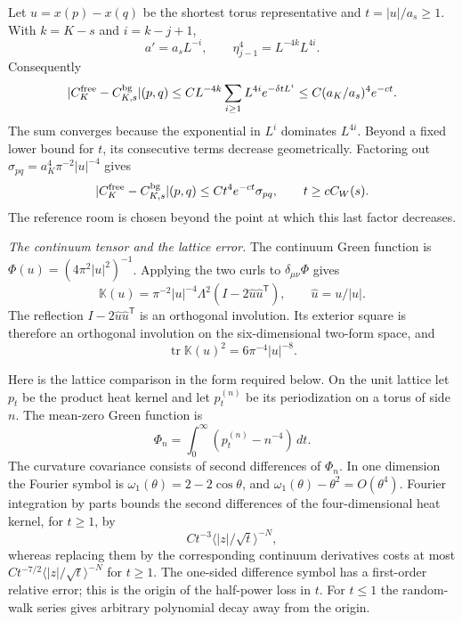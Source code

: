 \documentclass[11pt,letterpaper,reqno]{amsart}
\theoremstyle{definition}
\theoremstyle{remark}
\newcommand{\tr}{\operatorname{tr}}
\begin{document}
Let $u=x(p)-x(q)$ be the shortest torus representative and
$t=|u|/a_s\ge1$. With $k=K-s$ and $i=k-j+1$,
\[
 a'=a_sL^{-i},\qquad
 \eta_{j-1}^4=L^{-4k}L^{4i}.
\]
Consequently
\[
 |C_K^{\rm free}-C_{K,s}^{\rm bg}|(p,q)
 \le CL^{-4k}\sum_{i\ge1}L^{4i}e^{-\delta tL^i}
 \le C(a_K/a_s)^4e^{-ct}.
\]
The sum converges because the exponential in $L^i$ dominates
$L^{4i}$. Beyond a fixed lower bound for $t$, its consecutive
terms decrease geometrically. Factoring out
$\sigma_{pq}=a_K^4\pi^{-2}|u|^{-4}$ gives
\[
 |C_K^{\rm free}-C_{K,s}^{\rm bg}|(p,q)
       \le Ct^4e^{-ct}\sigma_{pq},
       \qquad t\ge cC_W(s).
\]
The reference room is chosen beyond the point at which this last
factor decreases.

\emph{The continuum tensor and the lattice error.}
The continuum Green function is $\Phi(u)=(4\pi^2|u|^2)^{-1}$.
Applying the two curls to $\delta_{\mu\nu}\Phi$ gives
\[
 \mathbb K(u)=\pi^{-2}|u|^{-4}
                    \Lambda^2(I-2\hat u\hat u^{\mathsf T}),
 \qquad \hat u=u/|u|.
\]
The reflection $I-2\hat u\hat u^{\mathsf T}$ is an orthogonal
involution. Its exterior square is therefore an orthogonal
involution on the six-dimensional two-form space, and
\[
 \tr\mathbb K(u)^2=6\pi^{-4}|u|^{-8}.
\]

Here is the lattice comparison in the form required below. On the
unit lattice let $p_t$ be the product heat kernel and let
$p_t^{(n)}$ be its periodization on a torus of side $n$. The
mean-zero Green function is
\[
 \Phi_n=\int_0^\infty(p_t^{(n)}-n^{-4})\,dt.
\]
The curvature covariance consists of second differences of
$\Phi_n$. In one dimension the Fourier symbol is
$\omega_1(\theta)=2-2\cos\theta$, and
$\omega_1(\theta)-\theta^2=O(\theta^4)$. Fourier integration
by parts bounds the second differences of the four-dimensional
heat kernel, for $t\ge1$, by
\[
 Ct^{-3}\langle |z|/\sqrt t\rangle^{-N},
\]
whereas replacing them by the corresponding continuum derivatives
costs at most
$Ct^{-7/2}\langle |z|/\sqrt t\rangle^{-N}$ for $t\ge1$.
The one-sided difference symbol has a first-order relative error;
this is the origin of the half-power loss in $t$. For $t\le1$
the random-walk series gives arbitrary polynomial decay away from
the origin.
\end{document}
